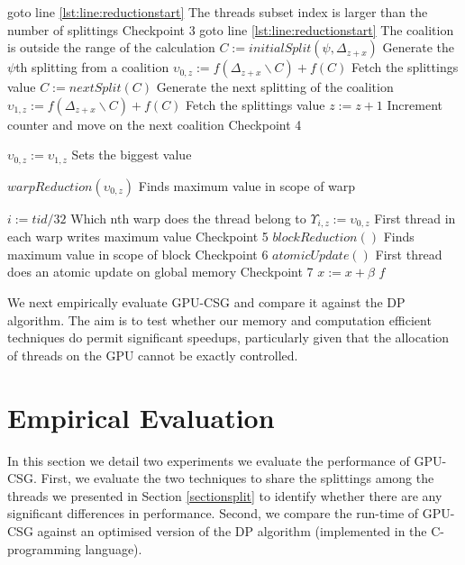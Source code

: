 \documentclass{llncs}
\begin{document}
\begin{algorithm}[!t]
\begin{algorithmic}[1]
  \IF{$\psi \geq \Psi$}
    \STATE goto line \ref{lst:line:reductionstart} \hfill The threads subset index is larger than the number of splittings
  \ENDIF
\hfill Checkpoint 3
    \label{lst:line:gotoif}
      \STATE goto line \ref{lst:line:reductionstart} \hfill The coalition is outside the range of the calculation
    \ENDIF
    \STATE $C := initialSplit(\psi,\Delta_{z+x})$ \hfill Generate the $\psi$th splitting from a coalition 
    \STATE $\upsilon_{0,z} := f(\Delta_{z+x}\backslash C)+f(C)$ \hfill Fetch the splittings value
    \STATE $C := nextSplit(C)$ \hfill Generate the next splitting of the coalition
    \STATE $\upsilon_{1,z} := f(\Delta_{z+x}\backslash C)+f(C)$ \hfill Fetch the splittings value
    \STATE $z := z + 1$ \hfill Increment counter and move on the next coalition
  \ENDFOR
\hfill Checkpoint 4
  \label{lst:line:reductionstart}
  
    \label{lst:line:checkif}
      \STATE $\upsilon_{0,z} := \upsilon_{1,z}$ \hfill Sets the biggest value
    \ENDIF
    
    \STATE $warpReduction(\upsilon_{0,z})$ \hfill Finds maximum value in scope of warp

      \STATE $i := tid / 32$ \hfill Which nth warp does the thread belong to
      \STATE $\Upsilon_{i,z} := \upsilon_{0,z}$ \hfill First thread in each warp writes maximum value
    \ENDIF
  \ENDFOR   \hfill Checkpoint 5
  \STATE $blockReduction()$\label{lst:line:blockReduction} \hfill Finds maximum value in scope of block
  \hfill Checkpoint 6
  \STATE $atomicUpdate()$\label{lst:line:reductionend} \hfill First thread does an atomic update on global memory
  \ENDIF  \hfill Checkpoint 7
  \STATE $x := x + \beta$
\ENDFOR
\RETURN $f$
\end{algorithmic}
\end{algorithm}

We next empirically evaluate GPU-CSG and compare it against the DP algorithm. The aim is to test whether our memory and computation efficient techniques do permit significant speedups, particularly given that the allocation of threads on the GPU cannot be exactly controlled.

\section{Empirical Evaluation}
In this section we detail two experiments we evaluate the performance of GPU-CSG. First, we evaluate the two techniques to share the splittings among the threads we presented in Section \ref{sectionsplit} to identify whether there are any significant differences in performance. Second, we compare the run-time of GPU-CSG against an optimised version of the DP algorithm (implemented in the C-programming language).
\end{document}
